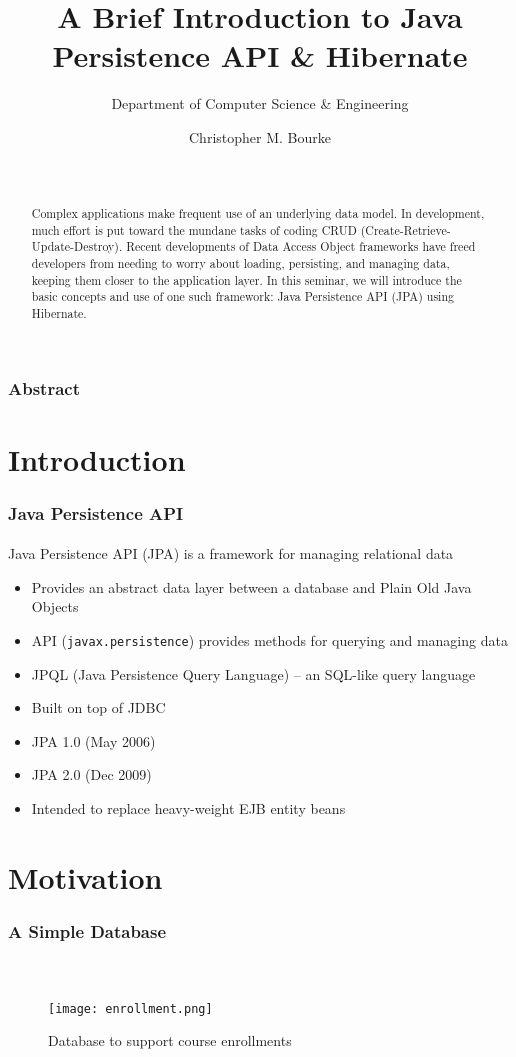 \documentclass{beamer}
\title[JPA]{A Brief Introduction to Java Persistence API \& Hibernate}
\subtitle{Department of Computer Science \& Engineering}
\author[Bourke]{Christopher M. Bourke\\ \email{cbourke@cse.unl.edu}} %
\date{~}
\begin{document}
\begin{frame}
        \titlepage
\end{frame}

\begin{frame}
  \frametitle{Abstract}

\begin{abstract}
Complex applications make frequent use of an underlying data model. In development, much effort is put toward the mundane tasks of coding CRUD (Create-Retrieve-Update-Destroy). Recent developments of Data Access Object frameworks have freed developers from needing to worry about loading, persisting, and managing data, keeping them closer to the application layer. In this seminar, we will introduce the basic concepts and use of one such framework: Java Persistence API (JPA) using Hibernate.
\end{abstract}
\end{frame}

\section{Introduction}

\begin{frame}
    \frametitle{Java Persistence API}
    \framesubtitle{}

Java Persistence API (JPA) is a framework for managing relational data
\begin{itemize}
  \item Provides an abstract data layer between a database and Plain Old Java Objects
  \item API (\lstinline|javax.persistence|) provides methods for querying and managing data
  \item JPQL (Java Persistence Query Language) -- an SQL-like query language
  \item Built on top of JDBC
  \item JPA 1.0 (May 2006)
  \item JPA 2.0 (Dec 2009)
  \item Intended to replace heavy-weight EJB entity beans
\end{itemize}

\end{frame}

\section{Motivation}

\begin{frame}
  \frametitle{A Simple Database}
  \framesubtitle{~}

  \begin{figure}[h]
  \centering
  \texttt{[image: enrollment.png]}
  \caption{Database to support course enrollments}
  \end{figure}

\end{frame}
\end{document}
